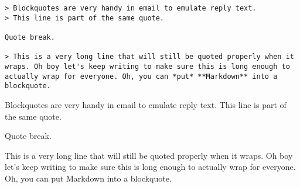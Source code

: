 \documentclass[a4paper, 11pt]{gfm}
\begin{document}
\begin{lstlisting}
> Blockquotes are very handy in email to emulate reply text.
> This line is part of the same quote.

Quote break.

> This is a very long line that will still be quoted properly when it wraps. Oh boy let's keep writing to make sure this is long enough to actually wrap for everyone. Oh, you can *put* **Markdown** into a blockquote.
\end{lstlisting}
\begin{blockquote}
Blockquotes are very handy in email to emulate reply text. This line is part of the same quote.
\end{blockquote}

Quote break.

\begin{blockquote}
This is a very long line that will still be quoted properly when it wraps. Oh boy let's keep writing to make sure this is long enough to actually wrap for everyone. Oh, you can put Markdown into a blockquote.
\end{blockquote}
\end{document}
